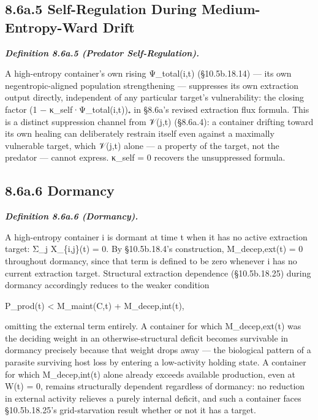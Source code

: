 \documentclass[
]{article}
\begin{document}
\hypertarget{a.5-self-regulation-during-medium-entropy-ward-drift}{%
\subsection{8.6a.5 Self-Regulation During Medium-Entropy-Ward
Drift}\label{a.5-self-regulation-during-medium-entropy-ward-drift}}

\emph{\textbf{Definition 8.6a.5 (Predator Self-Regulation).}}

A high-entropy container's own rising Ψ\_total(i,t) (§10.5b.18.14) ---
its own negentropic-aligned population strengthening --- suppresses its
own extraction output directly, independent of any particular target's
vulnerability: the closing factor (1 − κ\_self·Ψ\_total(i,t))₊ in
§8.6a's revised extraction flux formula. This is a distinct suppression
channel from 𝒱(j,t) (§8.6a.4): a container drifting toward its own
healing can deliberately restrain itself even against a maximally
vulnerable target, which 𝒱(j,t) alone --- a property of the target, not
the predator --- cannot express. κ\_self = 0 recovers the unsuppressed
formula.

\hypertarget{a.6-dormancy}{%
\subsection{8.6a.6 Dormancy}\label{a.6-dormancy}}

\emph{\textbf{Definition 8.6a.6 (Dormancy).}}

A high-entropy container i is dormant at time t when it has no active
extraction target: Σ\_j X\_\{i,j\}(t) = 0. By §10.5b.18.4's
construction, M\_decep,ext(t) = 0 throughout dormancy, since that term
is defined to be zero whenever i has no current extraction target.
Structural extraction dependence (§10.5b.18.25) during dormancy
accordingly reduces to the weaker condition

P\_prod(t) \textless{} M\_maint(C,t) + M\_decep,int(t),

omitting the external term entirely. A container for which
M\_decep,ext(t) was the deciding weight in an otherwise-structural
deficit becomes survivable in dormancy precisely because that weight
drops away --- the biological pattern of a parasite surviving host loss
by entering a low-activity holding state. A container for which
M\_decep,int(t) alone already exceeds available production, even at W(t)
= 0, remains structurally dependent regardless of dormancy: no reduction
in external activity relieves a purely internal deficit, and such a
container faces §10.5b.18.25's grid-starvation result whether or not it
has a target.
\end{document}
